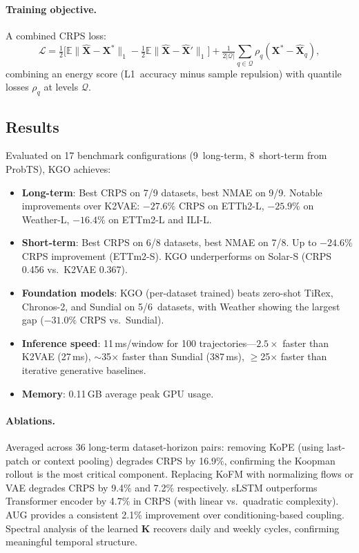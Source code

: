 \documentclass[11pt,a4paper]{article}
\begin{document}
\paragraph{Training objective.}
A combined CRPS loss:
\begin{equation}
  \mathcal{L} = \tfrac{1}{2}\bigl[\mathbb{E}\|\hat{\mathbf{X}} - \mathbf{X}^*\|_1 - \tfrac{1}{2}\mathbb{E}\|\hat{\mathbf{X}} - \hat{\mathbf{X}}'\|_1\bigr] + \tfrac{1}{2|\mathcal{Q}|}\sum_{q \in \mathcal{Q}} \rho_q(\mathbf{X}^* - \hat{\mathbf{X}}_q),
\end{equation}
combining an energy score (L1~accuracy minus sample repulsion) with quantile losses $\rho_q$ at levels $\mathcal{Q}$.

\subsection{Results}
Evaluated on 17 benchmark configurations (9~long-term, 8~short-term from ProbTS), KGO achieves:

\begin{itemize}
  \item \textbf{Long-term}: Best CRPS on 7/9 datasets, best NMAE on 9/9. Notable improvements over K2VAE: $-27.6\%$ CRPS on ETTh2-L, $-25.9\%$ on Weather-L, $-16.4\%$ on ETTm2-L and ILI-L.
  \item \textbf{Short-term}: Best CRPS on 6/8 datasets, best NMAE on 7/8. Up to $-24.6\%$ CRPS improvement (ETTm2-S). KGO underperforms on Solar-S (CRPS 0.456 vs.\ K2VAE 0.367).
  \item \textbf{Foundation models}: KGO (per-dataset trained) beats zero-shot TiRex, Chronos-2, and Sundial on 5/6~datasets, with Weather showing the largest gap ($-31.0\%$ CRPS vs.\ Sundial).
  \item \textbf{Inference speed}: 11\,ms/window for 100 trajectories---$2.5\times$ faster than K2VAE (27\,ms), $\sim$35$\times$ faster than Sundial (387\,ms), $\geq$25$\times$ faster than iterative generative baselines.
  \item \textbf{Memory}: 0.11\,GB average peak GPU usage.
\end{itemize}

\paragraph{Ablations.}
Averaged across 36 long-term dataset-horizon pairs: removing KoPE (using last-patch or context pooling) degrades CRPS by 16.9\%, confirming the Koopman rollout is the most critical component. Replacing KoFM with normalizing flows or VAE degrades CRPS by 9.4\% and 7.2\% respectively. sLSTM outperforms Transformer encoder by 4.7\% in CRPS (with linear vs.\ quadratic complexity). AUG provides a consistent 2.1\% improvement over conditioning-based coupling. Spectral analysis of the learned $\mathbf{K}$ recovers daily and weekly cycles, confirming meaningful temporal structure.
\end{document}
